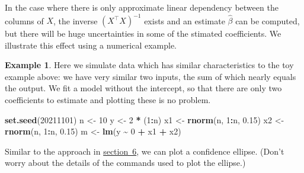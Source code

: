 \documentclass[
  a4paper,
]{article}
\newenvironment{Shaded}{\begin{snugshade}}{\end{snugshade}}
\newcommand{\DecValTok}[1]{\textcolor[rgb]{0.00,0.00,0.81}{#1}}
\newcommand{\FloatTok}[1]{\textcolor[rgb]{0.00,0.00,0.81}{#1}}
\newcommand{\FunctionTok}[1]{\textcolor[rgb]{0.13,0.29,0.53}{\textbf{#1}}}
\newcommand{\NormalTok}[1]{#1}
\newcommand{\OtherTok}[1]{\textcolor[rgb]{0.56,0.35,0.01}{#1}}
\newcommand{\SpecialCharTok}[1]{\textcolor[rgb]{0.81,0.36,0.00}{\textbf{#1}}}
\theoremstyle{definition}
\theoremstyle{definition}
\newtheorem{example}{Example}[section]
\theoremstyle{definition}
\theoremstyle{definition}
\theoremstyle{remark}
\begin{document}
In the case where there is only approximate linear dependency between the
columns of \(X\), the inverse \((X^\top X)^{-1}\) exists and an estimate \(\hat\beta\)
can be computed, but there will be huge uncertainties in some of the stimated
coefficients. We illustrate this effect using a numerical example.

\begin{example}
\protect\hypertarget{exm:mulcollell}{}\label{exm:mulcollell}Here we simulate data which has similar characteristics to the toy example
above: we have very similar two inputs, the sum of which nearly equals the
output. We fit a model without the intercept, so that there are only two
coefficients to estimate and plotting these is no problem.

\begin{Shaded}
\begin{Highlighting}[]
\FunctionTok{set.seed}\NormalTok{(}\DecValTok{20211101}\NormalTok{)}
\NormalTok{n }\OtherTok{\textless{}{-}} \DecValTok{10}
\NormalTok{y }\OtherTok{\textless{}{-}} \DecValTok{2} \SpecialCharTok{*}\NormalTok{ (}\DecValTok{1}\SpecialCharTok{:}\NormalTok{n)}
\NormalTok{x1 }\OtherTok{\textless{}{-}} \FunctionTok{rnorm}\NormalTok{(n, }\DecValTok{1}\SpecialCharTok{:}\NormalTok{n, }\FloatTok{0.15}\NormalTok{)}
\NormalTok{x2 }\OtherTok{\textless{}{-}} \FunctionTok{rnorm}\NormalTok{(n, }\DecValTok{1}\SpecialCharTok{:}\NormalTok{n, }\FloatTok{0.15}\NormalTok{)}
\NormalTok{m }\OtherTok{\textless{}{-}} \FunctionTok{lm}\NormalTok{(y }\SpecialCharTok{\textasciitilde{}} \DecValTok{0} \SpecialCharTok{+}\NormalTok{ x1 }\SpecialCharTok{+}\NormalTok{ x2)}
\end{Highlighting}
\end{Shaded}

Similar to the approach in \hyperref[coordinates-of-the-outline]{section~6},
we can plot a confidence ellipse. (Don't worry about the details of the
commands used to plot the ellipse.)


\end{example}
\end{document}
